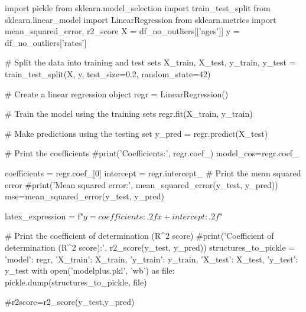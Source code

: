 \documentclass{beamer}
\begin{document}
\begin{pycode}
import pickle
from sklearn.model_selection import train_test_split
from sklearn.linear_model import LinearRegression
from sklearn.metrics import mean_squared_error, r2_score
X = df_no_outliers[['ages']]
y = df_no_outliers['rates']

	# Split the data into training and test sets
X_train, X_test, y_train, y_test = train_test_split(X, y, test_size=0.2, random_state=42)

# Create a linear regression object
regr = LinearRegression()

# Train the model using the training sets
regr.fit(X_train, y_train)

# Make predictions using the testing set
y_pred = regr.predict(X_test)

# Print the coefficients
#print('Coefficients:', regr.coef_)
model_cos=regr.coef_

coefficients = regr.coef_[0]
intercept = regr.intercept_
# Print the mean squared error
#print('Mean squared error:', mean_squared_error(y_test, y_pred))
mse=mean_squared_error(y_test, y_pred)

latex_expression = f"$y = {coefficients:.2f}x + {intercept:.2f}$"

# Print the coefficient of determination (R^2 score)
#print('Coefficient of determination (R^2 score):', r2_score(y_test, y_pred))
structures_to_pickle = {
    'model': regr,
    'X_train': X_train,
    'y_train': y_train,
    'X_test': X_test,
    'y_test': y_test
}
with open('modelplus.pkl', 'wb') as file:
    pickle.dump(structures_to_pickle, file)

#r2score=r2_score(y_test,y_pred)
\end{pycode}
\end{document}
